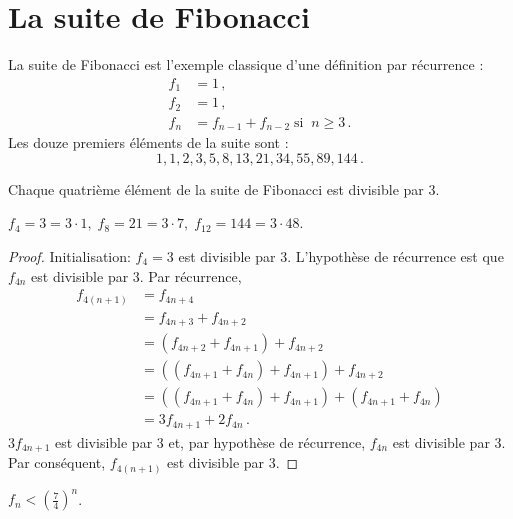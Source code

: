 
\section{La suite de Fibonacci}\label{s.induction-fibonacci}

La suite de Fibonacci est l'exemple classique d'une définition par récurrence :
\begin{align*}
f_1 &= 1\,,\\
f_2 &= 1\,,\\
f_n &= f_{n-1} + f_{n-2}\; \textrm{si} \;\; n \geq 3\,.
\end{align*}
Les douze premiers éléments de la suite sont :
\[
1, 1, 2, 3, 5, 8, 13, 21, 34, 55, 89, 144\,.
\]
\begin{theorem}\label{thm.fib-div3}
Chaque quatrième élément de la suite  de Fibonacci est divisible par $3$.
\end{theorem}

\begin{example}
$f_4=3=3\cdot 1,\; f_8=21=3\cdot 7,\; f_{12}=144=3\cdot 48$.
\end{example}

\begin{proof}
Initialisation: $f_4=3$ est divisible par $3$. L'hypothèse de récurrence est que $f_{4n}$ est divisible par $3$. Par récurrence,
\begin{align*}
f_{4(n+1)} &= f_{4n+4}\\
&= f_{4n+3}+f_{4n+2}\\
&= (f_{4n+2}+f_{4n+1})+f_{4n+2}\\
&= ((f_{4n+1}+f_{4n})+f_{4n+1})+f_{4n+2}\\
&= ((f_{4n+1}+f_{4n})+f_{4n+1})+(f_{4n+1}+f_{4n})\\
&= 3f_{4n+1}+2f_{4n}\,.
\end{align*}
$3f_{4n+1}$ est divisible par $3$ et, par hypothèse de récurrence, $f_{4n}$ est divisible par $3$. Par conséquent, $f_{4(n+1)}$ est divisible par $3$.
\end{proof}



\begin{theorem}\label{thm.seven-fourths}
$f_n < \left(\displaystyle\frac{7}{4}\right)^n$.
\end{theorem}

